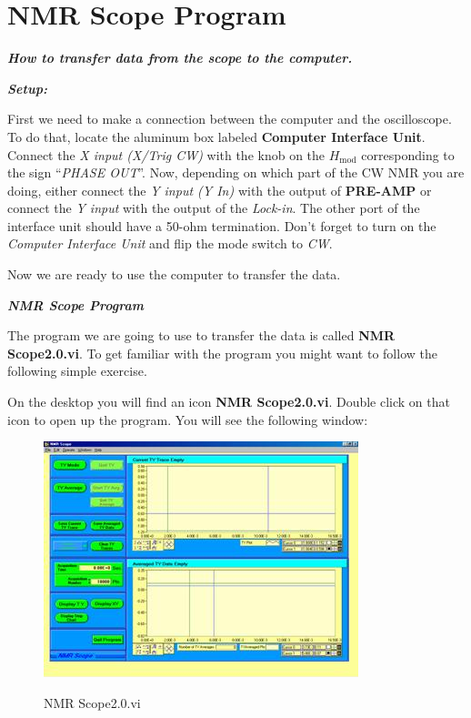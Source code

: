 \documentclass{../lab}
\begin{document}
\section{NMR Scope Program}

\emph{\textbf{How to transfer data from the scope to the computer.}}

\emph{\textbf{Setup:}}

First we need to make a connection between the computer and the oscilloscope. To do that, locate the aluminum box labeled \textbf{Computer Interface Unit}. Connect the \emph{X input (X/Trig CW)} with the knob on the $H_\text{mod}$ corresponding to the sign ``\emph{PHASE OUT}''. Now, depending on which part of the CW NMR you are doing, either connect the \emph{Y input (Y In)} with the output of \textbf{PRE-AMP} or connect the \emph{Y input} with the output of the \emph{Lock-in}. The other port of the interface unit should have a 50-ohm termination. Don't forget to turn on the \emph{Computer Interface Unit} and flip the mode switch to \emph{CW}.

Now we are ready to use the computer to transfer the data.

\emph{\textbf{NMR Scope Program}}

The program we are going to use to transfer the data is called \textbf{NMR Scope2.0.vi}. To get familiar with the program you might want to follow the following simple exercise.

On the desktop you will find an icon \textbf{NMR Scope2.0.vi}. Double click on that icon to open up the program. You will see the following window:

\begin{figure}[h]
    \centering
    \href{http://experimentationlab.berkeley.edu/sites/default/files/images/NMR35.jpg}{\includegraphics[width=0.5\linewidth]{images/NMR35.jpg}}
    \caption{NMR Scope2.0.vi}
    \label{fig:NMR35}
\end{figure}
\end{document}
